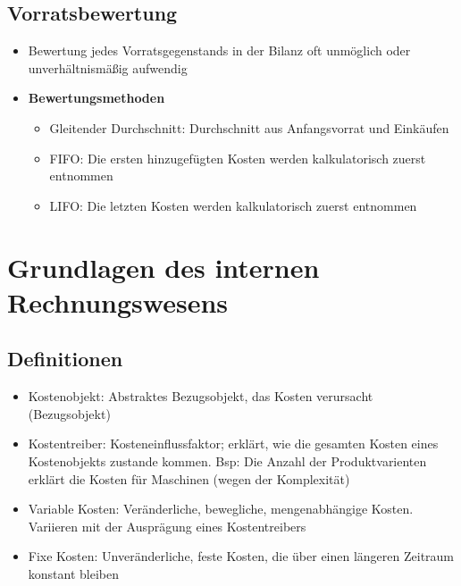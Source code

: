 \subsection{Vorratsbewertung}
\begin{itemize}
	\item Bewertung jedes Vorratsgegenstands in der Bilanz oft unmöglich oder unverhältnismäßig aufwendig
	\item \textbf{Bewertungsmethoden}
	\begin{itemize}
		\item Gleitender Durchschnitt: Durchschnitt aus Anfangsvorrat und Einkäufen
		\item FIFO: Die ersten hinzugefügten Kosten werden kalkulatorisch zuerst entnommen
		\item LIFO: Die letzten Kosten werden kalkulatorisch zuerst entnommen
	\end{itemize}
\end{itemize}


\section{Grundlagen des internen Rechnungswesens}

\subsection{Definitionen}
\begin{itemize}
	\item Kostenobjekt: Abstraktes Bezugsobjekt, das Kosten verursacht (Bezugsobjekt)
	\item Kostentreiber: Kosteneinflussfaktor; erklärt, wie die gesamten Kosten eines Kostenobjekts zustande kommen. Bsp: Die Anzahl der Produktvarienten erklärt die Kosten für Maschinen (wegen der Komplexität)
	\item Variable Kosten: Veränderliche, bewegliche, mengenabhängige Kosten. Variieren mit der Ausprägung eines Kostentreibers
	\item Fixe Kosten: Unveränderliche, feste Kosten, die über einen längeren Zeitraum konstant bleiben
\end{itemize}


